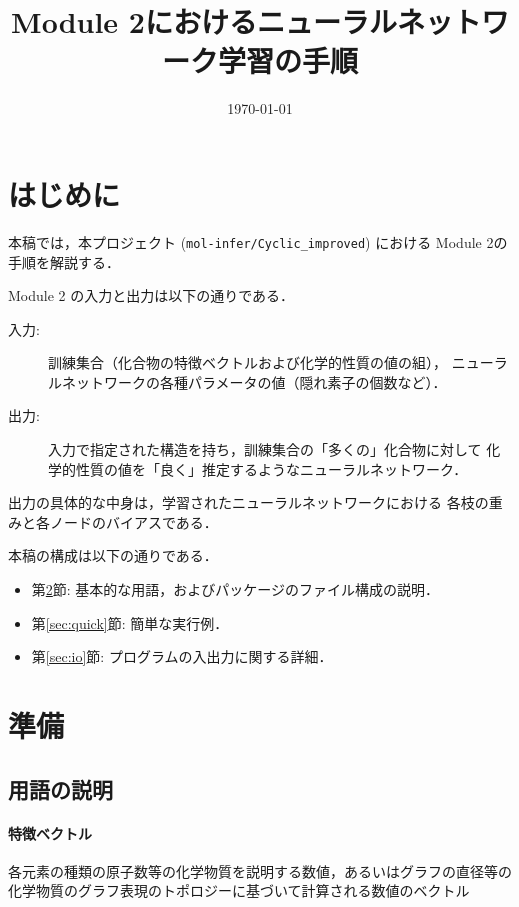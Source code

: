 \documentclass[11pt,dvipdfmx,twoside]{jarticle}
\title{Module 2におけるニューラルネットワーク学習の手順}
\author{\project}
\date{\today}
\newcommand{\project}{{\tt mol-infer/Cyclic\_improved}}
\newcommand{\secref}[1]{第\ref{sec:#1}節}
\begin{document}
\maketitle

\makeatletter 
\let\c@lstlisting\c@figure
\makeatother

\section{はじめに}
本稿では，本プロジェクト (\project) における Module 2の手順を解説する．

Module 2 の入力と出力は以下の通りである．
\begin{oframed}
\begin{description}
\item[入力:] 訓練集合（化合物の特徴ベクトルおよび化学的性質の値の組），
  ニューラルネットワークの各種パラメータの値（隠れ素子の個数など）．
\item[出力:] 入力で指定された構造を持ち，訓練集合の「多くの」化合物に対して
  化学的性質の値を「良く」推定するようなニューラルネットワーク．
\end{description}
\end{oframed}
出力の具体的な中身は，学習されたニューラルネットワークにおける
各枝の重みと各ノードのバイアスである．

本稿の構成は以下の通りである．
\begin{itemize}
\item \secref{preparation}: 基本的な用語，およびパッケージのファイル構成の説明．
\item \secref{quick}: 簡単な実行例．
\item \secref{io}: プログラムの入出力に関する詳細．
\end{itemize}

\newpage
\section{準備}
\label{sec:preparation}

\subsection{用語の説明}
\paragraph{特徴ベクトル}
各元素の種類の原子数等の化学物質を説明する数値，あるいはグラフの直径等の化学物質のグラフ表現のトポロジーに基づいて計算される数値のベクトル
\end{document}
